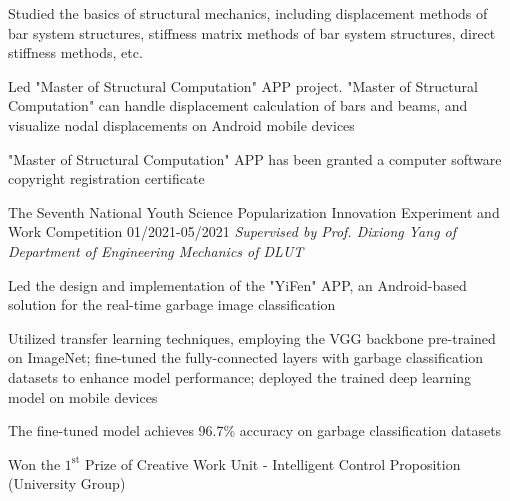 \begin{cventries2}
{\begin{cvitems}
        \item Studied the basics of structural mechanics, including displacement methods of bar system structures, stiffness matrix methods of bar system structures, direct stiffness methods, etc. 
		    \item Led "Master of Structural Computation" APP project. "Master of Structural Computation" can handle displacement calculation of bars and beams, and visualize nodal displacements on Android mobile devices
		    \item "Master of Structural Computation" APP has been granted a computer software copyright registration certificate
      \end{cvitems}
    } 
    \cventrynew
    {The Seventh National Youth Science Popularization Innovation Experiment and Work Competition} %
    {01/2021-05/2021} %
    {\textnormal{\textit{Supervised by Prof. Dixiong Yang of Department of Engineering Mechanics of DLUT}
    }}
    {
      \begin{cvitems} %
        \item Led the design and implementation of the "YiFen" APP, an Android-based solution for the real-time garbage image classification
        \item Utilized transfer learning techniques, employing the VGG backbone pre-trained on ImageNet; fine-tuned the fully-connected layers with garbage classification datasets to enhance model performance; deployed the trained deep learning model on mobile devices
        \item The fine-tuned model achieves 96.7\% accuracy on garbage classification datasets
        \item Won the $1^{\text{st}}$ Prize of Creative Work Unit - Intelligent Control Proposition (University Group)
      \end{cvitems}
    }

\end{cventries2}
